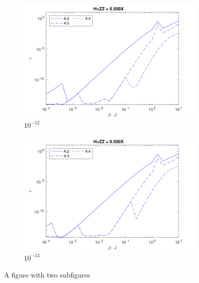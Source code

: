 \begin{figure} \ContinuedFloat
    \centering
    \begin{subfigure}{\textwidth}
        \centering
        \includegraphics[width=0.8\linewidth]{Figuren/mpo_construction/sigm0/e12.pdf}
        \caption{ ${10}^{-12}$}
        \label{fig:sub1}
    \end{subfigure}%

    \begin{subfigure}{\textwidth}
        \centering
        \includegraphics[width=0.8\linewidth]{Figuren/mpo_construction/sigm0/e13.pdf}
        \caption{${10}^{-13}$}
        \label{fig:sub2}
    \end{subfigure}
    \caption{A figure with two subfigures}
    \label{fig:sigman0}
\end{figure}

